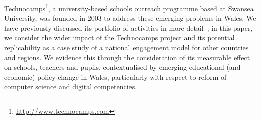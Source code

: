 \documentclass{llncs}
\begin{document}


Technocamps\footnote{\url{http://www.technocamps.com}}, a
university-based schools outreach programme based at Swansea
University, was founded in 2003 to address these emerging problems in
Wales. We have previously discussed its portfolio of activities in
more detail~\cite{crick+moller-wipsce2015}; in this paper, we consider
the wider impact of the Technocamps project and its potential
replicability as a case study of a national engagement model for other
countries and regions. We evidence this through the consideration of
its measurable effect on schools, teachers and pupils, contextualised
by emerging educational (and economic) policy change in Wales,
particularly with respect to reform of computer science and digital
competencies.
\end{document}

